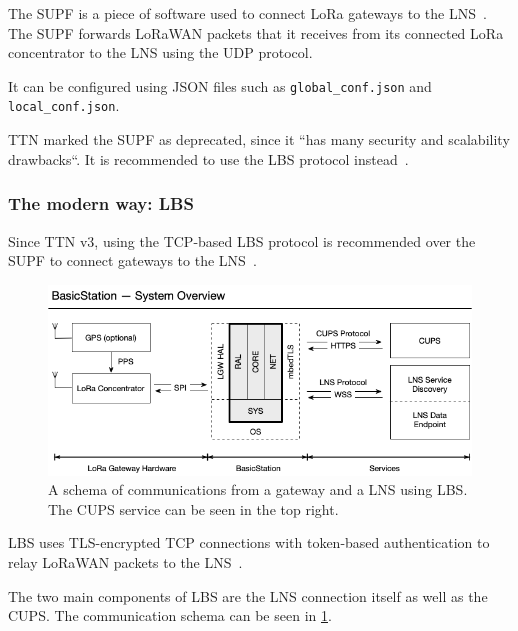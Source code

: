 The \ac{SUPF} is a piece of software used to connect \ac{LoRa} gateways to the \ac{LNS}~\cite{the_things_industries_bv_semtech_2022}.
The \ac{SUPF} forwards \ac{LoRaWAN} packets that it receives from its connected \ac{LoRa} concentrator to the \ac{LNS} using the \ac{UDP} protocol.

It can be configured using JSON files such as \lstinline{global_conf.json} and \lstinline{local_conf.json}.

\ac{TTN} marked the \acl{SUPF} as deprecated, since it ``has many security and scalability drawbacks``.
It is recommended to use the \ac{LBS} protocol instead~\cite{the_things_industries_bv_semtech_2022}.

\subsubsection{The modern way: \acl{LBS}}\label{sec:lorawan-lbs}

Since \ac{TTN} v3, using the \ac{TCP}-based \acl{LBS} protocol is recommended over the \ac{SUPF} to connect gateways to the \ac{LNS}~\cite{the_things_industries_bv_semtech_2022}.

\begin{figure}[htbp]
    \centering
    \includegraphics[width=1\textwidth]{pictures/lorawan-structure/lora-basics-station-structure.png}
    \caption{
        A schema of communications from a gateway and a \ac{LNS} using \acf{LBS}.
        The \ac{CUPS} service can be seen in the top right.~\protect\cite{semtech_lora_developer_portal_lora_2022}
    }\label{pic:lora-basics-station-schema}
\end{figure}

\ac{LBS} uses \ac{TLS}-encrypted \ac{TCP} connections with token-based authentication to relay \ac{LoRaWAN} packets to the \ac{LNS}~\cite{the_things_industries_bv_lora_2022}.

The two main components of \acl{LBS} are the \ac{LNS} connection itself as well as the \acf{CUPS}.
The communication schema can be seen in \cref{pic:lora-basics-station-schema}.

